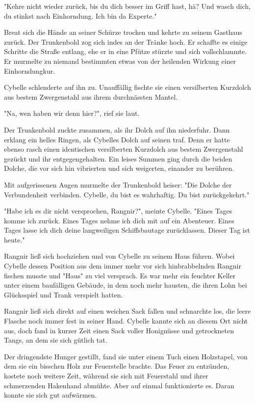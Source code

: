 "Kehre nicht wieder zurück, bis du dich besser im Griff hast, hä? Und wasch dich, du stinkst nach Einhorndung. Ich bin da Experte."

Breat sich die Hände an seiner Schürze trocken und kehrte zu seinem Gasthaus zurück. Der Trunkenbold zog sich indes an der Tränke hoch. Er schaffte es einige Schritte die Straße entlang, ehe er in eine Pfütze stürzte und sich vollschlammte. Er murmelte zu niemand bestimmten etwas von der heilenden Wirkung einer Einhorndungkur.

Cybelle schlenderte auf ihn zu. Unauffällig fischte sie einen versilberten Kurzdolch aus bestem Zwergenstahl aus ihrem durchnässten Mantel.

"Na, wen haben wir denn hier?", rief sie laut.

Der Trunkenbold zuckte zusammen, als ihr Dolch auf ihn niederfuhr. Dann erklang ein helles Ringen, als Cybelles Dolch auf seinen traf. Denn er hatte ebenso rasch einen identischen versilberten Kurzdolch aus bestem Zwergenstahl gezückt und ihr entgegengehalten. Ein leises Summen ging durch die beiden Dolche, die vor sich hin vibrierten und sich weigerten, einander zu berühren.

Mit aufgerissenen Augen murmelte der Trunkenbold heiser: "Die Dolche der Verbundenheit verbinden. Cybelle, du bist es wahrhaftig. Du bist zurückgekehrt."

"Habe ich es dir nicht versprochen, Rangnir?", meinte Cybelle. "Eines Tages komme ich zurück. Eines Tages nehme ich dich mit auf ein Abenteuer. Eines Tages lasse ich dich deine langweiligen Schiffsbautage zurücklassen. Dieser Tag ist heute."

Rangnir ließ sich hochziehen und von Cybelle zu seinem Haus führen. Wobei Cybelle dessen Position aus dem immer mehr vor sich hinbrabbelnden Rangnir fischen musste und "Haus" zu viel versprach. Es war mehr ein feuchter Keller unter einem baufälligen Gebäude, in dem noch mehr  hausten, die ihren Lohn bei Glücksspiel und Trank verspielt hatten.

Rangnir ließ sich direkt auf einen weichen Sack fallen und schnarchte los, die leere Flasche noch immer fest in seiner Hand. Cybelle kannte sich an diesem Ort nicht aus, doch fand in kurzer Zeit einen Sack voller Honignüsse und getrockneten Tangs, an dem sie sich gütlich tat.

Der dringendste Hunger gestillt, fand sie unter einem Tuch einen Holzstapel, von dem sie ein bisschen Holz zur Feuerstelle brachte. Das Feuer zu entzünden, kostete noch weitere Zeit, während sie sich mit Feuerstahl und ihrer schmerzenden Hakenhand abmühte. Aber auf einmal funktionierte es. Daran konnte sie sich gut aufwärmen.

